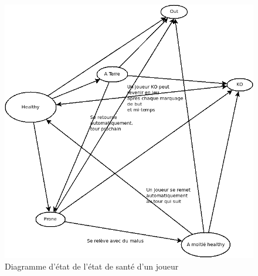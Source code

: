 \documentclass{article}
\begin{document}
    \begin{figure}[H]
        \centerline{\includegraphics[scale=0.4]{img/WellbeingGraph.png}}
        \caption{\label{DiaWellbeingGraph} Diagramme d'état de l'état de santé d'un joueur}
    \end{figure}
\end{document}
